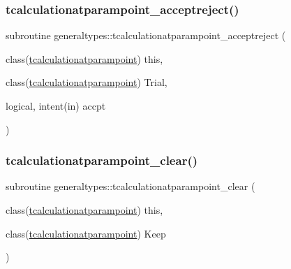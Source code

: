 \mbox{\label{namespacegeneraltypes_a4807ce873100fa001203158f5ed66fbd}} 
\subsubsection{\texorpdfstring{tcalculationatparampoint\+\_\+acceptreject()}{tcalculationatparampoint\_acceptreject()}}
{\footnotesize\ttfamily subroutine generaltypes\+::tcalculationatparampoint\+\_\+acceptreject (\begin{DoxyParamCaption}\item[{class(\mbox{\hyperlink{structgeneraltypes_1_1tcalculationatparampoint}{tcalculationatparampoint}})}]{this,  }\item[{class(\mbox{\hyperlink{structgeneraltypes_1_1tcalculationatparampoint}{tcalculationatparampoint}})}]{Trial,  }\item[{logical, intent(in)}]{accpt }\end{DoxyParamCaption})\hspace{0.3cm}{\ttfamily [private]}}

\mbox{\label{namespacegeneraltypes_ace116f1d7f9e8a3fdff59a6c376273e3}} 
\subsubsection{\texorpdfstring{tcalculationatparampoint\+\_\+clear()}{tcalculationatparampoint\_clear()}}
{\footnotesize\ttfamily subroutine generaltypes\+::tcalculationatparampoint\+\_\+clear (\begin{DoxyParamCaption}\item[{class(\mbox{\hyperlink{structgeneraltypes_1_1tcalculationatparampoint}{tcalculationatparampoint}})}]{this,  }\item[{class(\mbox{\hyperlink{structgeneraltypes_1_1tcalculationatparampoint}{tcalculationatparampoint}})}]{Keep }\end{DoxyParamCaption})\hspace{0.3cm}{\ttfamily [private]}}

